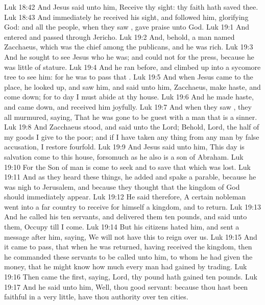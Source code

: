 \vs Luk 18:42 And Jesus said unto him, Receive thy sight: thy faith hath saved thee.
\vs Luk 18:43 And immediately he received his sight, and followed him, glorifying God: and all the people, when they saw , gave praise unto God.
\vs Luk 19:1 And  entered and passed through Jericho.
\vs Luk 19:2 And, behold,  a man named Zacchaeus, which was the chief among the publicans, and he was rich.
\vs Luk 19:3 And he sought to see Jesus who he was; and could not for the press, because he was little of stature.
\vs Luk 19:4 And he ran before, and climbed up into a sycomore tree to see him: for he was to pass that .
\vs Luk 19:5 And when Jesus came to the place, he looked up, and saw him, and said unto him, Zacchaeus, make haste, and come down; for to day I must abide at thy house.
\vs Luk 19:6 And he made haste, and came down, and received him joyfully.
\vs Luk 19:7 And when they saw , they all murmured, saying, That he was gone to be guest with a man that is a sinner.
\vs Luk 19:8 And Zacchaeus stood, and said unto the Lord; Behold, Lord, the half of my goods I give to the poor; and if I have taken any thing from any man by false accusation, I restore  fourfold.
\vs Luk 19:9 And Jesus said unto him, This day is salvation come to this house, forsomuch as he also is a son of Abraham.
\vs Luk 19:10 For the Son of man is come to seek and to save that which was lost.
\vs Luk 19:11 And as they heard these things, he added and spake a parable, because he was nigh to Jerusalem, and because they thought that the kingdom of God should immediately appear.
\vs Luk 19:12 He said therefore, A certain nobleman went into a far country to receive for himself a kingdom, and to return.
\vs Luk 19:13 And he called his ten servants, and delivered them ten pounds, and said unto them, Occupy till I come.
\vs Luk 19:14 But his citizens hated him, and sent a message after him, saying, We will not have this  to reign over us.
\vs Luk 19:15 And it came to pass, that when he was returned, having received the kingdom, then he commanded these servants to be called unto him, to whom he had given the money, that he might know how much every man had gained by trading.
\vs Luk 19:16 Then came the first, saying, Lord, thy pound hath gained ten pounds.
\vs Luk 19:17 And he said unto him, Well, thou good servant: because thou hast been faithful in a very little, have thou authority over ten cities.
